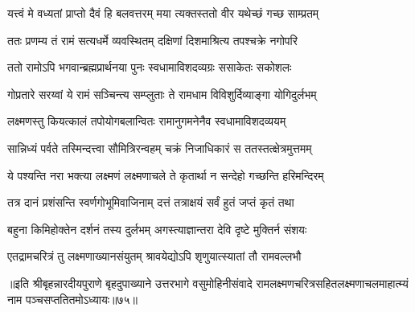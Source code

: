 \twolineshloka
{यत्त्वं मे वध्यतां प्राप्तो दैवं हि बलवत्तरम्}
{मया त्यक्तस्ततो वीर यथेच्छं गच्छ साम्प्रतम्}%

\twolineshloka
{ततः प्रणम्य तं रामं सत्यधर्मे व्यवस्थितम्}
{दक्षिणां दिशमाश्रित्य तपश्चक्रे नगोपरि}%

\twolineshloka
{ततो रामोऽपि भगवान्ब्रह्मप्रार्थनया पुनः}
{स्वधामाविशदव्यग्रः ससाकेतः सकोशलः}%

\twolineshloka
{गोप्रतारे सरय्वां ये रामं सञ्चिन्त्य सम्प्लुताः}
{ते रामधाम विविशुर्दिव्याङ्गा योगिदुर्लभम्}%

\twolineshloka
{लक्ष्मणस्तु कियत्कालं तपोयोगबलान्वितः}
{रामानुगमनेनैव स्वधामाविशदव्ययम्}%

\twolineshloka
{सान्निध्यं पर्वते तस्मिन्दत्त्वा सौमित्रिरन्वहम्}
{चक्रं निजाधिकारं स ततस्तत्क्षेत्रमुत्तमम्}%

\twolineshloka
{ये पश्यन्ति नरा भक्त्या लक्ष्मणं लक्ष्मणाचले}
{ते कृतार्था न सन्देहो गच्छन्ति हरिमन्दिरम्}%

\twolineshloka
{तत्र दानं प्रशंसन्ति स्वर्णगोभूमिवाजिनाम्}
{दत्तं तत्राक्षयं सर्वं हुतं जप्तं कृतं तथा}%

\twolineshloka
{बहुना किमिहोक्तेन दर्शनं तस्य दुर्लभम्}
{अगस्त्याज्ञान्तरा देवि दृष्टे मुक्तिर्न संशयः}%

\twolineshloka
{एतद्रामचरित्रं तु लक्ष्मणाख्यानसंयुतम्}
{श्रावयेद्योऽपि शृणुयात्स्यातां तौ रामवल्लभौ}%

॥इति श्रीबृहन्नारदीयपुराणे बृहदुपाख्याने उत्तरभागे वसुमोहिनीसंवादे रामलक्ष्मणचरित्रसहितलक्ष्मणाचलमाहात्म्यं नाम पञ्चसप्ततितमोऽध्यायः॥७५॥
